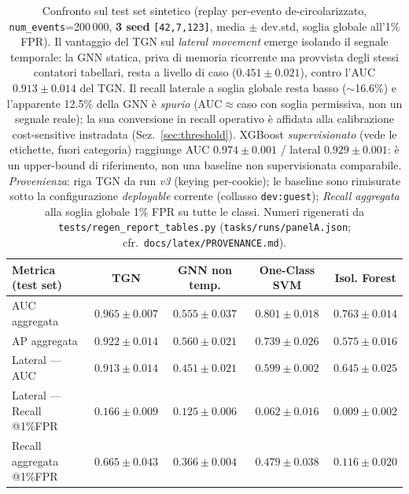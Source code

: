\documentclass[11pt,a4paper]{report}
\begin{document}
\begin{table}[ht!]
\centering
\footnotesize
\renewcommand{\arraystretch}{1.4}
\setlength{\tabcolsep}{5pt}
\begin{tabular}{l c c c c}
\hline
\textbf{Metrica (test set)} & \textbf{TGN} & \textbf{GNN non temp.} & \textbf{One-Class SVM} & \textbf{Isol. Forest} \\
\hline
AUC aggregata                  & $\mathbf{0.965}\pm0.007$ & $0.555\pm0.037$ & $0.801\pm0.018$ & $0.763\pm0.014$ \\
AP aggregata                   & $\mathbf{0.922}\pm0.014$ & $0.560\pm0.021$ & $0.739\pm0.026$ & $0.575\pm0.016$ \\
\hline
Lateral --- AUC                & $\mathbf{0.913}\pm0.014$ & $0.451\pm0.021$ & $0.599\pm0.002$ & $0.645\pm0.025$ \\
Lateral --- Recall @1\%FPR     & $\mathbf{0.166}\pm0.009$ & $0.125\pm0.006$ & $0.062\pm0.016$ & $0.009\pm0.002$ \\
Recall aggregata @1\%FPR       & $\mathbf{0.665}\pm0.043$ & $0.366\pm0.004$ & $0.479\pm0.038$ & $0.116\pm0.020$ \\
\hline
\end{tabular}
\caption{Confronto sul test set sintetico (replay per-evento de-circolarizzato, \texttt{num\_events}=200\,000, \textbf{3 seed} \texttt{[42,7,123]}, media $\pm$ dev.std, soglia globale all'1\% FPR). Il vantaggio del TGN sul \textit{lateral movement} emerge isolando il segnale temporale: la GNN statica, priva di memoria ricorrente ma provvista degli stessi contatori tabellari, resta a livello di caso ($0.451\pm0.021$), contro l'AUC $0.913\pm0.014$ del TGN. Il recall laterale a soglia globale resta basso ($\sim$16.6\%) e l'apparente 12.5\% della GNN è \emph{spurio} (AUC$\approx$caso con soglia permissiva, non un segnale reale); la sua conversione in recall operativo è affidata alla calibrazione cost-sensitive instradata (Sez.~\ref{sec:threshold}). XGBoost \emph{supervisionato} (vede le etichette, fuori categoria) raggiunge AUC $0.974\pm0.001$ / lateral $0.929\pm0.001$: è un upper-bound di riferimento, non una baseline non supervisionata comparabile. \emph{Provenienza}: riga TGN da run \emph{v3} (keying per-cookie); le baseline sono rimisurate sotto la configurazione \emph{deployable} corrente (collasso \texttt{dev:guest}); \textit{Recall aggregata} alla soglia globale 1\% FPR su tutte le classi. Numeri rigenerati da \texttt{tests/regen\_report\_tables.py} (\texttt{tasks/runs/panelA.json}; cfr.\ \texttt{docs/latex/PROVENANCE.md}).}
\label{tab:baselines}
\end{table}
\end{document}
